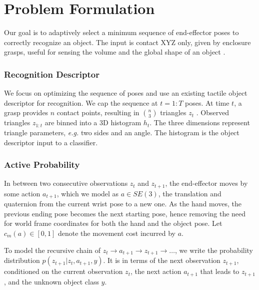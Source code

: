 \documentclass[letterpaper, 10 pt, conference]{ieeeconf}  %
\begin{document}


\section{Problem Formulation}
\label{sec:formulation}

Our goal is to adaptively select a minimum sequence of end-effector poses to correctly recognize an object. The input is contact XYZ only, given by enclosure grasps, useful for sensing the volume and the global shape of an object \cite{lederman1987}. 

\subsubsection{Recognition Descriptor}

We focus on optimizing the sequence of poses and use an existing tactile object descriptor \cite{triangles} for recognition.
We cap the sequence at $t=1:T$ poses. At time $t$, a grasp provides $n$ contact points, resulting in $\binom{n}{3}$ triangles $z_t$ \cite{triangles}. Observed triangles $z_{1:t}$ are binned into a 3D histogram $h_t$. The three dimensions represent triangle parameters, \textit{e.g.} two sides and an angle. The histogram is the object descriptor input to a classifier.

\subsubsection{Active Probability}
\label{sec:formulation_core_prob}

In between two consecutive observations $z_t$ and $z_{t+1}$, the end-effector moves by some action $a_{t+1}$, which we model as $a \in SE(3)$, the translation and quaternion from the current wrist pose to a new one. As the hand moves, the previous ending pose becomes the next starting pose, hence removing the need for world frame coordinates for both the hand and the object pose. Let $c_m(a) \in [0,1]$ denote the movement cost incurred by $a$.

To model the recursive chain of $z_t \rightarrow a_{t+1} \rightarrow z_{t+1} \rightarrow \ldots$, we write the probability distribution $p(z_{t+1} | z_t, a_{t+1}, y)$. %
It is in terms of the next observation $z_{t+1}$, conditioned on the current observation $z_t$, the next action $a_{t+1}$ that leads to $z_{t+1}$, and the unknown object class $y$. %
\end{document}
